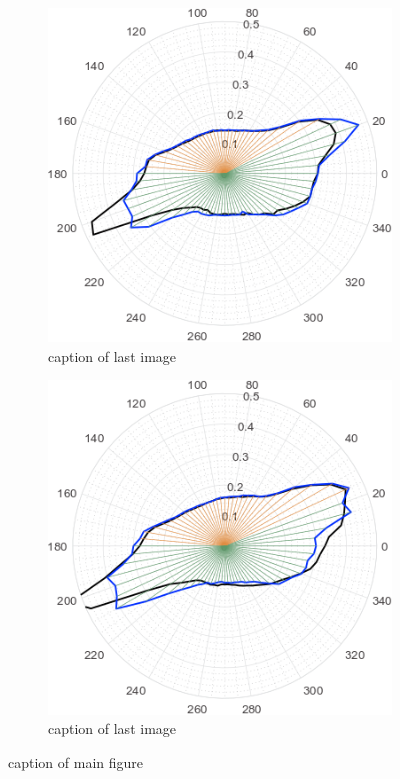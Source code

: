\begin{figure}
\begin{subfigure}[t]{0.49\textwidth}
        \includegraphics[width=0.8\linewidth]{STYLESTUFF/round04.png}
    \caption{caption of last image} 
    \end{subfigure}
    \begin{subfigure}[t]{0.49\textwidth}
     \centering
        \includegraphics[width=0.8\linewidth]{STYLESTUFF/round05.png}
    \caption{caption of last image} 
    \end{subfigure}
    \caption{caption of main figure}
\end{figure}

